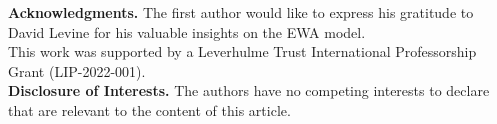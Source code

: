 \documentclass[runningheads]{llncs}
\begin{document}


{\small
\noindent\textbf{Acknowledgments.}
The first author would like to express his gratitude to David Levine for his valuable insights on the EWA model.\\
This work was supported by a Leverhulme Trust International Professorship Grant (LIP-2022-001).\\

\noindent\textbf{Disclosure of Interests.}
The authors have no competing interests to declare that are relevant to the content of this article. 
}


\end{document}
